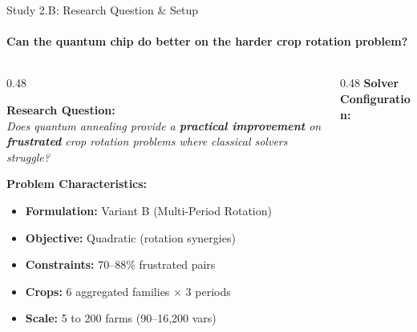 \documentclass[aspectratio=169,10pt]{beamer}
\begin{document}
\begin{frame}{Study 2.B: Research Question \& Setup}
    \framesubtitle{Can the quantum chip do better on the harder crop rotation problem?}
    
    \begin{columns}[T]
        \begin{column}{0.48\textwidth}
            \begin{keybox}
                \centering\small
                \textbf{Research Question:}\\[4pt]
                \textit{Does quantum annealing provide a \textbf{practical improvement} on \textbf{frustrated} crop rotation problems where classical solvers struggle?}
            \end{keybox}
            
            \vspace{0.3cm}
            \small\textbf{Problem Characteristics:}
            \begin{itemize}\scriptsize
                \item \textbf{Formulation:} Variant B (Multi-Period Rotation)
                \item \textbf{Objective:} \textcolor{alertRed}{Quadratic} (rotation synergies)
                \item \textbf{Constraints:} \textcolor{alertRed}{70--88\% frustrated pairs}
                \item \textbf{Crops:} 6 aggregated families $\times$ 3 periods
                \item \textbf{Scale:} 5 to 200 farms (90--16,200 vars)
            \end{itemize}
        \end{column}
        
        \begin{column}{0.48\textwidth}
            \small\textbf{Solver Configuration:}
            
            \vspace{0.2cm}
            

\end{column}
\end{columns}
\end{frame}
\end{document}
